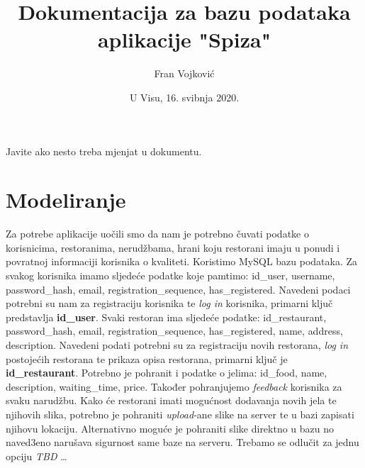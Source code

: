 \documentclass[12pt]{scrartcl}
\begin{document}
\title{Dokumentacija za bazu podataka aplikacije "Spiza"}
\author{Fran Vojković }
\date{U Visu, 16. svibnja 2020.}
\maketitle
\tableofcontents

\begin{napomena}
Javite ako nesto treba mjenjat u dokumentu.
\end{napomena}
\section{Modeliranje}

Za potrebe aplikacije uočili smo da nam je potrebno čuvati podatke o korisnicima, restoranima, nerudžbama, hrani koju restorani imaju u ponudi i povratnoj informaciji korisnika o kvaliteti. Koristimo MySQL bazu podataka. Za svakog korisnika imamo sljedeće podatke koje pamtimo: \textsf{id\_user}, \textsf{username}, \textsf{password\_hash}, \textsf{email}, \textsf{registration\_sequence}, \textsf{has\_registered}. Navedeni podaci potrebni su nam za registraciju korisnika te \textit{log in} korisnika, primarni ključ predstavlja \textbf{\textsf{id\_user}}. Svaki restoran ima sljedeće podatke: \textsf{id\_restaurant}, \textsf{password\_hash}, \textsf{email}, \textsf{registration\_sequence}, \textsf{has\_registered}, \textsf{name}, \textsf{address}, \textsf{description}. Navedeni podati potrebni su za registraciju novih restorana, \textit{log in }postojećih restorana te prikaza opisa restorana, primarni ključ je \textbf{\textsf{id\_restaurant}}. Potrebno je pohranit i podatke o jelima: \textsf{id\_food}, \textsf{name}, \textsf{description}, \textsf{waiting\_time}, \textsf{price}. Također pohranjujemo \textit{feedback} korisnika za svaku narudžbu. Kako će restorani imati mogućnost dodavanja novih jela te njihovih slika, potrebno je pohraniti \textit{upload}-ane slike na server te u bazi zapisati njihovu lokaciju. Alternativno moguće je pohraniti slike direktno u bazu no naved3eno narušava sigurnost same baze na serveru. Trebamo se odlučit za jednu opciju \textit{TBD} \ldots

\pagebreak[2]
\end{document}
